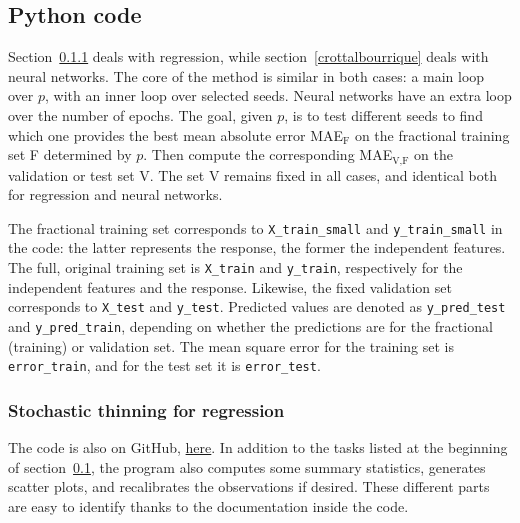 \documentclass[oneside,10pt]{book}
\begin{document}
\subsection{Python code}\label{pygirleatmen}

Section~\ref{pytrevea} deals with regression, while section~\ref{crottalbourrique} deals with neural networks.  The core of the method is similar in both cases:
  a main loop over $p$, with an inner loop over selected seeds. Neural networks have an extra loop over the number of epochs.  The goal,
  given $p$, is to test different seeds to find which one provides the best mean absolute error MAE$_\text{F}$ on the fractional training set F determined by $p$. 
  Then compute the corresponding MAE$_\text{V,F}$ on the validation or test set V. The set V remains fixed in all cases, and identical both for regression and
 neural networks.

The fractional training set corresponds to \texttt{X\_train\_small} and \texttt{y\_train\_small} in the code: the latter represents the response, the former the independent features.
 The full, original training set is \texttt{X\_train} and \texttt{y\_train}, respectively for the independent features and the response.
Likewise, the fixed validation set corresponds to \texttt{X\_test} and \texttt{y\_test}. Predicted values are denoted as 
\texttt{y\_pred\_test} and \texttt{y\_pred\_train}, depending on whether the predictions are for the fractional (training) or validation set. The mean square error for the training set is \texttt{error\_train}, and for the test set it is \texttt{error\_test}. 


\subsubsection{Stochastic thinning for regression}\label{pytrevea}

The code is also on GitHub, \href{https://github.com/VincentGranville/Statistical-Optimization/blob/main/thinned_regression.py}{here}. In addition to the
 tasks listed at the beginning of section~\ref{pygirleatmen}, the program also computes some summary statistics, generates scatter plots, and recalibrates the
 observations if desired. These different parts are easy to identify thanks to the documentation inside the code.\vspace{1ex}
\end{document}
